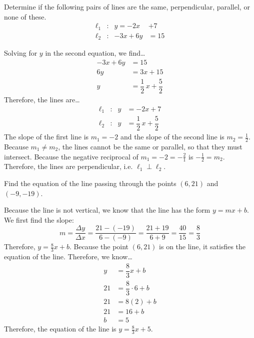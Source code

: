 \documentclass[11pt,letterpaper]{article}
\begin{document}
\newpage



 Determine if the following pairs of lines are the same, perpendicular, parallel, or none of these. 
	\[
	\begin{aligned}
	\ell_1&: & y= -2x& + 7 \\
	\ell_2&: & -3x + 6y&= 15
	\end{aligned}
	\] \pspace

\sol Solving for $y$ in the second equation, we find\dots
	\[
	\begin{aligned}
	-3x + 6y&= 15 \\[0.3cm]
	6y&= 3x + 15 \\[0.3cm]
	y&= \dfrac{1}{2}\,x + \dfrac{5}{2}
	\end{aligned}
	\] 
Therefore, the lines are\dots
	\[
	\begin{aligned}
	\ell_1&: & y&= -2x + 7 \\
	\ell_2&: & y&= \dfrac{1}{2}\,x + \dfrac{5}{2}
	\end{aligned}
	\]
The slope of the first line is $m_1= -2$ and the slope of the second line is $m_2= \frac{1}{2}$. Because $m_1 \neq m_2$, the lines cannot be the same or parallel, so that they must intersect. Because the negative reciprocal of $m_1= -2= -\frac{2}{1}$ is $-\frac{1}{2}= m_2$. Therefore, the lines are perpendicular, i.e. $\ell_1 \perp \ell_2$. 



\newpage



 Find the equation of the line passing through the points $(6, 21)$ and $(-9, -19)$. \pspace

\sol Because the line is not vertical, we know that the line has the form $y= mx + b$. We first find the slope:
	\[
	m= \dfrac{\Delta y}{\Delta x}= \dfrac{21 - (-19)}{6 - (-9)}= \dfrac{21 + 19}{6 + 9}= \dfrac{40}{15}= \dfrac{8}{3}
	\]
Therefore, $y= \frac{8}{3}x + b$. Because the point $(6, 21)$ is on the line, it satisfies the equation of the line. Therefore, we know\dots
	\[
	\begin{aligned}
	y&= \dfrac{8}{3}x + b \\[0.3cm]
	21&= \dfrac{8}{3} \cdot 6 + b \\[0.3cm]
	21&= 8(2) + b \\[0.3cm]
	21&= 16 + b \\[0.3cm]
	b&= 5
	\end{aligned}
	\]
Therefore, the equation of the line is $y= \frac{8}{3}x + 5$. 
\end{document}
